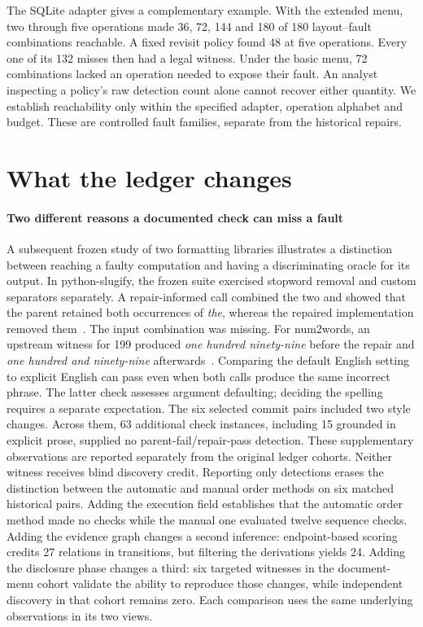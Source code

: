 \documentclass[conference]{IEEEtran}
\begin{document}
The SQLite adapter gives a complementary example. With the extended menu, two through five operations made 36, 72, 144 and 180 of 180 layout--fault combinations reachable. A fixed revisit policy found 48 at five operations. Every one of its 132 misses then had a legal witness. Under the basic menu, 72 combinations lacked an operation needed to expose their fault. An analyst inspecting a policy's raw detection count alone cannot recover either quantity. We establish reachability only within the specified adapter, operation alphabet and budget. These are controlled fault families, separate from the historical repairs.

\section{What the ledger changes}
\paragraph{Two different reasons a documented check can miss a fault}
A subsequent frozen study of two formatting libraries illustrates a distinction between reaching a faulty computation and having a discriminating oracle for its output. In python-slugify, the frozen suite exercised stopword removal and custom separators separately. A repair-informed call combined the two and showed that the parent retained both occurrences of \emph{the}, whereas the repaired implementation removed them~\cite{slugjoint}. The input combination was missing. For num2words, an upstream witness for 199 produced \emph{one hundred ninety-nine} before the repair and \emph{one hundred and ninety-nine} afterwards~\cite{numand}. Comparing the default English setting to explicit English can pass even when both calls produce the same incorrect phrase. The latter check assesses argument defaulting; deciding the spelling requires a separate expectation. The six selected commit pairs included two style changes. Across them, 63 additional check instances, including 15 grounded in explicit prose, supplied no parent-fail/repair-pass detection. These supplementary observations are reported separately from the original ledger cohorts. Neither witness receives blind discovery credit.
Reporting only detections erases the distinction between the automatic and manual order methods on six matched historical pairs. Adding the execution field establishes that the automatic order method made no checks while the manual one evaluated twelve sequence checks. Adding the evidence graph changes a second inference: endpoint-based scoring credits 27 relations in transitions, but filtering the derivations yields 24. Adding the disclosure phase changes a third: six targeted witnesses in the document-menu cohort validate the ability to reproduce those changes, while independent discovery in that cohort remains zero. Each comparison uses the same underlying observations in its two views.
\end{document}
